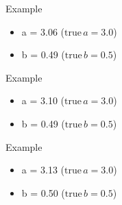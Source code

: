\begin{frame}{Example}
  \begin{itemize}
    \item a = 3.06 ($\text{true}\, a = 3.0$)
    \item b = 0.49 ($\text{true}\, b = 0.5$)
  \end{itemize}
\end{frame}

\begin{frame}{Example}
  \begin{itemize}
    \item a = 3.10 ($\text{true}\, a = 3.0$)
    \item b = 0.49 ($\text{true}\, b = 0.5$)
  \end{itemize}
\end{frame}

\begin{frame}{Example}
  \begin{itemize}
    \item a = 3.13 ($\text{true}\, a = 3.0$)
    \item b = 0.50 ($\text{true}\, b = 0.5$)
  \end{itemize}
\end{frame}
